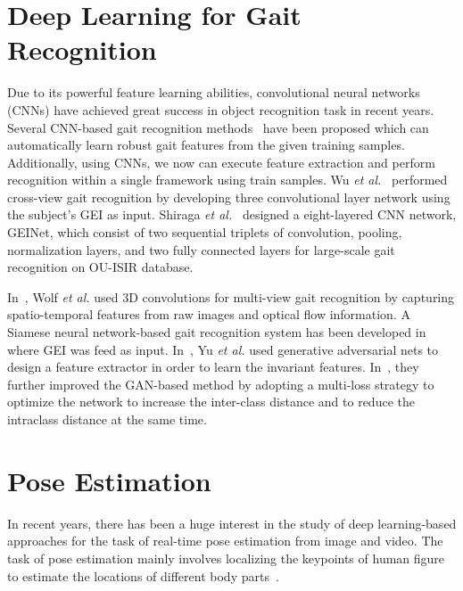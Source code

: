 \section{Deep Learning for Gait Recognition} \label{sec:deep_learning_gait_rec}
Due to its powerful feature learning abilities, convolutional neural networks (CNNs) have achieved great success in object recognition task in recent years. Several CNN-based gait recognition methods~\cite{Wu_17, Shiraga_16, Wolf_16, Zhang_16, Yu_17, Yu_19} have been proposed which can automatically learn robust gait features from the given training samples. Additionally, using CNNs, we now can execute feature extraction and perform recognition within a single framework using train samples. Wu \textit{et al.}~\cite{Wu_17} performed cross-view gait recognition by developing three convolutional layer network using the subject's GEI as input. Shiraga \textit{et al.}~\cite{Shiraga_16} designed a eight-layered CNN network, GEINet, which consist of two sequential triplets of convolution, pooling, normalization layers, and two fully connected layers for large-scale gait recognition on OU-ISIR database. 

In~\cite{Wolf_16}, Wolf \textit{et al.} used 3D convolutions for multi-view gait recognition by capturing spatio-temporal features from raw images and optical flow information. A Siamese neural network-based gait recognition system has been developed in~\cite{Zhang_16} where GEI was feed as input. In~\cite{Yu_17}, Yu \textit{et al.} used generative adversarial nets to design a feature extractor in order to learn the invariant features. In~\cite{Yu_19}, they further improved the GAN-based method by adopting a multi-loss strategy to optimize the network to increase the inter-class distance and to reduce the intraclass distance at the same time.


\section{Pose Estimation} \label{sec:pose_estimation}
In recent years, there has been a huge interest in the study of deep learning-based approaches for the task of real-time pose estimation from image and video. The task of pose estimation mainly involves localizing the keypoints of human figure to estimate the locations of different body parts~\cite{Wei_16, Cao_19}.  

